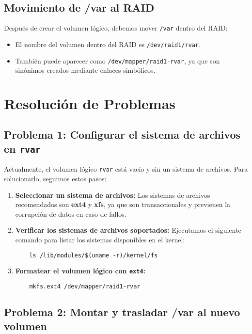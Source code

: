 \subsection{Movimiento de /var al RAID}
Después de crear el volumen lógico, debemos mover \texttt{/var} dentro del RAID:

\begin{itemize}
    \item El nombre del volumen dentro del RAID es \texttt{/dev/raid1/rvar}.
    \item También puede aparecer como \texttt{/dev/mapper/raid1-rvar}, ya que son sinónimos creados mediante enlaces simbólicos.
\end{itemize}

\section{Resolución de Problemas}

\subsection{Problema 1: Configurar el sistema de archivos en \texttt{rvar}}

Actualmente, el volumen lógico \texttt{rvar} está vacío y sin un sistema de archivos. Para solucionarlo, seguimos estos pasos:

\begin{enumerate}
    \item \textbf{Seleccionar un sistema de archivos:}  
    Los sistemas de archivos recomendados son \textbf{ext4} y \textbf{xfs}, ya que son transaccionales y previenen la corrupción de datos en caso de fallos.  
    \item \textbf{Verificar los sistemas de archivos soportados:}  
    Ejecutamos el siguiente comando para listar los sistemas disponibles en el kernel:
    \begin{verbatim}
    ls /lib/modules/$(uname -r)/kernel/fs
    \end{verbatim}
    \item \textbf{Formatear el volumen lógico con \texttt{ext4}:}
    \begin{verbatim}
    mkfs.ext4 /dev/mapper/raid1-rvar
    \end{verbatim}
\end{enumerate}

\subsection{Problema 2: Montar y trasladar /var al nuevo volumen}

